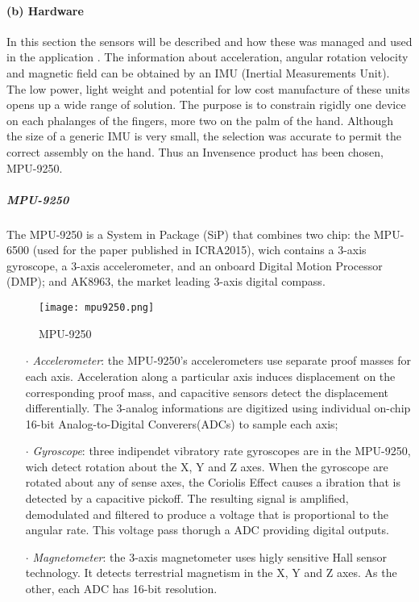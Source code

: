 \paragraph{(b) Hardware}

In this section the sensors will be described and how these was managed and used in the application . The information about acceleration, angular rotation velocity and  magnetic field can be obtained by an IMU (Inertial Measurements Unit).  The low power, light weight and potential for low cost manufacture of these units opens up a wide range of solution. The  purpose is to constrain rigidly one device on each phalanges of the fingers, more two  on the palm of the hand.  Although the size of a generic IMU is very small, the selection  was accurate to permit the correct assembly on the hand. Thus an Invensence product has been chosen, MPU-9250.  \\
\newline

\subparagraph{MPU-9250}

\noindent The MPU-9250 is a System in Package (SiP) that combines two chip: the MPU-6500 (used for the paper published in ICRA2015), wich contains a 3-axis gyroscope, a 3-axis accelerometer, and an onboard Digital Motion Processor (DMP); and AK8963, the market leading 3-axis digital compass.  
\begin{figure}[h]
\centering
\texttt{[image: mpu9250.png]}
\caption{MPU-9250}
\label{fig:mpu9250}
\end{figure}

\begin{itemize}
\item[$\cdot$] \textit{Accelerometer}: the MPU-9250's accelerometers use separate proof masses for each axis. Acceleration along a particular axis induces displacement on the corresponding proof mass, and capacitive sensors detect the displacement differentially. The 3-analog informations are digitized using individual on-chip 16-bit Analog-to-Digital Converers(ADCs) to sample each axis;

 \item[$\cdot$] \textit{Gyroscope}: three indipendet vibratory rate gyroscopes are in the MPU-9250, wich detect rotation about the X, Y and Z axes. When the gyroscope are rotated about any of sense axes, the Coriolis Effect causes a ibration that is detected by a capacitive pickoff. The resulting signal is amplified, demodulated and filtered to produce a voltage that is proportional to the angular rate. This voltage pass thorugh a ADC providing digital outputs.

 \item[$\cdot$] \textit{Magnetometer}: the 3-axis magnetometer uses higly sensitive Hall sensor technology. It detects terrestrial magnetism in the X, Y and Z axes. As the other, each ADC has 16-bit resolution. 
\end{itemize}


